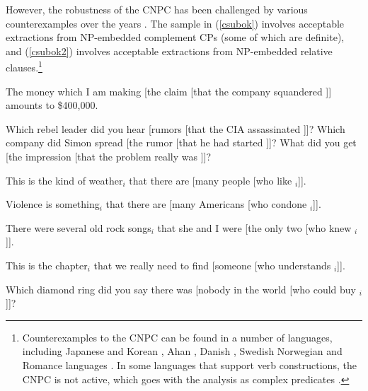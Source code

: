 \documentclass[output=paper
	        ,collection
	        ,collectionchapter
 	        ,biblatex
                ,babelshorthands
                ,newtxmath
                ,draftmode
                ,colorlinks, citecolor=brown
]{langscibook}
\begin{document}
However, the robustness of the CNPC  has been challenged by various
counterexamples over the years \citep{Ross67,pollardsag,kluender,postal98,saghof}.
The sample in (\ref{csubok}) involves acceptable
extractions from NP-embedded complement CPs (some of which are definite),
 and (\ref{csubok2}) involves acceptable extractions from NP-embedded relative clauses.\footnote{Counterexamples to  the CNPC can be found in a number of languages, 
including Japanese and  Korean \citep{kunojap,Nishigauchi99},  Ahan \citep{saah},  Danish  \citep[Chapter 2]{shir}, Swedish  \citep{allwood,engdahl82} Norwegian  \citep{taraldsen82} and Romance languages \citep{Cinque10}.  In some languages that support verb constructions, the CNPC is 
 not active, which goes with the analysis as complex predicates \citet{vives}.}



\eal
 \label{csubok}
\ex The money which I am making [the claim [that the company squandered \spc]] amounts to \$400,000.\\
 \citep[206, 207]{pollardsag}

\ex  Which rebel leader did you hear [rumors [that the CIA assassinated \spc]]?
\ex Which company did Simon spread [the rumor [that he had started \spc]]?
\ex What did you get [the impression [that the problem really was \spc]]?\\
\citep{kluender}
\zl

\eal \label{csubok2}
\ex This is the kind of weather$_i$ that there are [many people [who like \spc$_i$]].\\
\citep{shirlappin}

\ex Violence is something$_i$ that there are [many Americans [who condone \spc$_i$]].\\
\citep[108]{mccawley81}

\ex There were several old rock songs$_i$ that she and I were [the only two [who
knew \spc$_i$]].\\
\citep{chungmc}

\ex This is the chapter$_i$ that we really need to find [someone [who understands \spc$_i$]].\\
\citep[238]{kluender92}

\ex Which diamond ring did you say there was [nobody in the world [who could
buy \spc$_i$]]?\\
\citep[206]{pollardsag}
\end{document}
